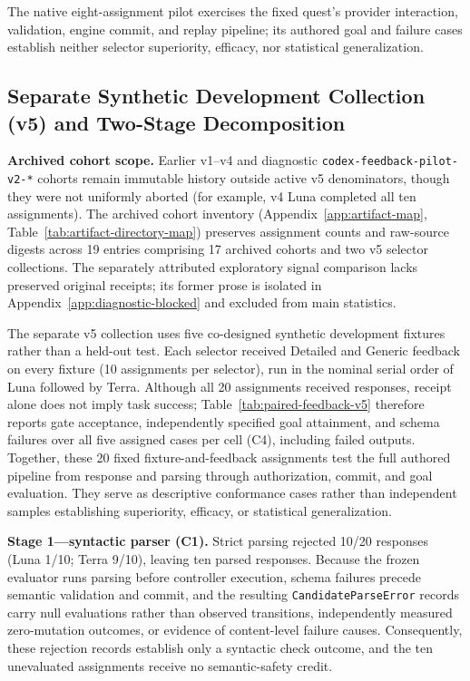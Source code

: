 \documentclass[journal]{IEEEtran}
\begin{document}
The native eight-assignment pilot exercises the fixed quest's provider interaction, validation, engine commit, and replay pipeline; its authored goal and failure cases establish neither selector superiority, efficacy, nor statistical generalization.






\subsection{Separate Synthetic Development Collection (v5) and Two-Stage Decomposition}
\noindent\textbf{Archived cohort scope.} Earlier v1--v4 and diagnostic \texttt{codex-feedback-pilot-v2-*} cohorts remain immutable history outside active v5 denominators, though they were not uniformly aborted (for example, v4 Luna completed all ten assignments). The archived cohort inventory (Appendix~\ref{app:artifact-map}, Table~\ref{tab:artifact-directory-map}) preserves assignment counts and raw-source digests across 19 entries comprising 17 archived cohorts and two v5 selector collections. The separately attributed exploratory signal comparison lacks preserved original receipts; its former prose is isolated in Appendix~\ref{app:diagnostic-blocked} and excluded from main statistics.

The separate v5 collection uses five co-designed synthetic development fixtures rather than a held-out test. Each selector received Detailed and Generic feedback on every fixture (10 assignments per selector), run in the nominal serial order of Luna followed by Terra. Although all 20 assignments received responses, receipt alone does not imply task success; Table~\ref{tab:paired-feedback-v5} therefore reports gate acceptance, independently specified goal attainment, and schema failures over all five assigned cases per cell (C4), including failed outputs.
Together, these 20 fixed fixture-and-feedback assignments test the full authored pipeline from response and parsing through authorization, commit, and goal evaluation. They serve as descriptive conformance cases rather than independent samples establishing superiority, efficacy, or statistical generalization.

\textbf{Stage 1---syntactic parser (C1).} Strict parsing rejected 10/20 responses (Luna 1/10; Terra 9/10), leaving ten parsed responses. Because the frozen evaluator runs parsing before controller execution, schema failures precede semantic validation and commit, and the resulting \texttt{CandidateParseError} records carry null evaluations rather than observed transitions, independently measured zero-mutation outcomes, or evidence of content-level failure causes. Consequently, these rejection records establish only a syntactic check outcome, and the ten unevaluated assignments receive no semantic-safety credit.
\end{document}
